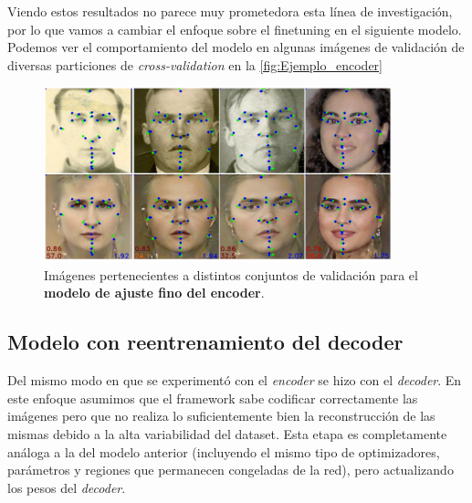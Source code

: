     \medskip

    \noindent Viendo estos resultados no parece muy prometedora esta línea de investigación, por lo que vamos a cambiar el enfoque sobre el finetuning en el siguiente modelo. Podemos ver el comportamiento del modelo en algunas imágenes de validación de diversas particiones de \textit{cross-validation} en la \autoref{fig:Ejemplo_encoder}

    \begin{figure}[!h]
        \centering
        \includegraphics[width=0.9\textwidth]{img/image_encoder.png}
        \caption{Imágenes pertenecientes a distintos conjuntos de validación para el \textbf{modelo de ajuste fino del encoder}.}
        \label{fig:Ejemplo_encoder}
    \end{figure}

    \subsection{Modelo con reentrenamiento del decoder}
        \noindent Del mismo modo en que se experimentó con el \textit{encoder} se hizo con el \textit{decoder}. En este enfoque asumimos que el framework sabe codificar correctamente las imágenes pero que no realiza lo suficientemente bien la reconstrucción de las mismas debido a la alta variabilidad del dataset. Esta etapa es completamente análoga a la del modelo anterior (incluyendo el mismo tipo de optimizadores, parámetros y regiones que permanecen congeladas de la red), pero actualizando los pesos del \textit{decoder}.

